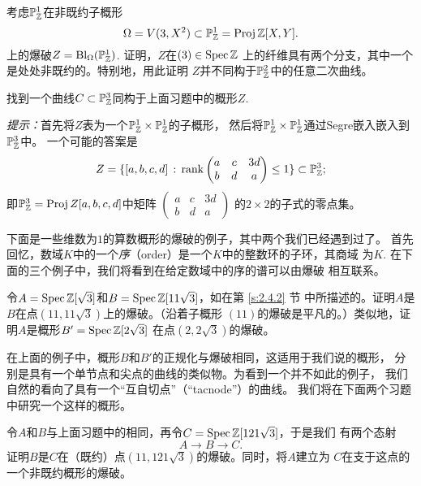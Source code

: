 \begin{exe}\label{exe:4.49}
考虑$\mathbb{P}_{\mathbb{Z}}^1$在非既约子概形
\[
	\Omega=V(3,X^2)\subset \mathbb P_{\mathbb{Z}}^1=\operatorname{Proj} \mathbb{Z}[X,Y].
\]
上的爆破$Z=\operatorname{Bl}_{\Omega}(\mathbb{P}_{\mathbb{Z}}^1)$. 证明，$Z$在$(3)\in \operatorname{Spec} \mathbb{Z}$
上的纤维具有两个分支，其中一个是处处非既约的。特别地，用此证明
$Z$并不同构于$\mathbb{P}_{\mathbb{Z}}^2$中的任意二次曲线。
\end{exe}


\begin{exe}\label{exe:4.50}
找到一个曲线$C\subset \mathbb{P}_{\mathbb{Z}}^3$同构于上面习题中的概形$Z$.

\emph{提示：}首先将$Z$表为一个$\mathbb{P}_{\mathbb{Z}}^1\times \mathbb{P}_{\mathbb{Z}}^1$的子概形，
然后将$\mathbb{P}_{\mathbb{Z}}^1\times \mathbb{P}_{\mathbb{Z}}^1$通过Segre嵌入嵌入到$\mathbb{P}_{\mathbb{Z}}^3$中。
一个可能的答案是
\[
	Z=\{[a,b,c,d]\,:\,\operatorname{rank}\begin{pmatrix}
		a&c&3d\\ b&d&a
	\end{pmatrix}\leq 1\}\subset \mathbb P_{\mathbb{Z}}^3;
\]
即$\mathbb{P}_{\mathbb{Z}}^3=\operatorname{Proj} Z[a,b,c,d]$中矩阵
\(
	\begin{pmatrix}
		a&c&3d\\
		b&d&a
	\end{pmatrix}
\)
的$2\times 2$的子式的零点集。
\end{exe}

下面是一些维数为$1$的算数概形的爆破的例子，其中两个我们已经遇到过了。
首先回忆，数域$K$中的一个\emph{序}（order）是一个$K$中的整数环的子环，其商域
为$K$. 在下面的三个例子中，我们将看到在给定数域中的序的谱可以由爆破
相互联系。

\begin{exe}\label{exe:4.51}
令$A=\operatorname{Spec} \mathbb{Z}[\sqrt 3]$和$B=\operatorname{Spec} \mathbb{Z}[11\sqrt 3]$，如在第 \ref{s:2.4.2} 节
中所描述的。证明$A$是$B$在点$(11,11\sqrt 3)$上的爆破。（沿着子概形
$(11)$的爆破是平凡的。）类似地，证明$A$是概形$B'=\operatorname{Spec} \mathbb{Z}[2\sqrt 3]$
在点$(2,2\sqrt 3)$的爆破。
\end{exe}

在上面的例子中，概形$B$和$B'$的正规化与爆破相同，这适用于我们说的概形，
分别是具有一个单节点和尖点的曲线的类似物。为看到一个并不如此的例子，
我们自然的看向了具有一个“互自切点”（``tacnode''）的曲线。
我们将在下面两个习题中研究一个这样的概形。

\begin{exe}\label{exe:4.52}
令$A$和$B$与上面习题中的相同，再令$C=\operatorname{Spec} \mathbb{Z}[121\sqrt 3]$，于是我们
有两个态射
\[
	A\longrightarrow B\longrightarrow C.
\]
证明$B$是$C$在（既约）点$(11,121\sqrt 3)$的爆破。同时，将$A$建立为
$C$在支于这点的一个非既约概形的爆破。
\end{exe}

